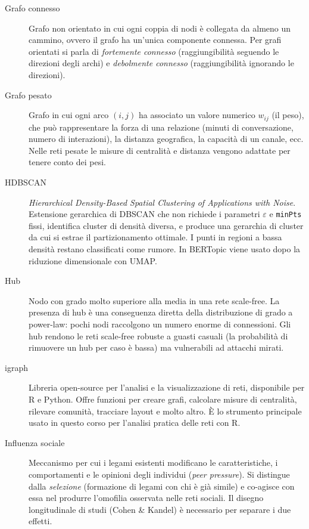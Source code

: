 \documentclass[12pt,a4paper]{article}
\begin{document}
\begin{description}
  \item[Grafo connesso] Grafo non orientato in cui ogni coppia di nodi è collegata da
  almeno un cammino, ovvero il grafo ha un'unica componente connessa. Per grafi orientati
  si parla di \textit{fortemente connesso} (raggiungibilità seguendo le direzioni degli
  archi) e \textit{debolmente connesso} (raggiungibilità ignorando le direzioni).

  \item[Grafo pesato] Grafo in cui ogni arco $(i,j)$ ha associato un valore numerico
  $w_{ij}$ (il peso), che può rappresentare la forza di una relazione (minuti di
  conversazione, numero di interazioni), la distanza geografica, la capacità di un canale,
  ecc. Nelle reti pesate le misure di centralità e distanza vengono adattate per tenere
  conto dei pesi.

  \item[HDBSCAN] \textit{Hierarchical Density-Based Spatial Clustering of Applications
  with Noise}. Estensione gerarchica di DBSCAN che non richiede i parametri $\varepsilon$
  e \texttt{minPts} fissi, identifica cluster di densità diversa, e produce una gerarchia
  di cluster da cui si estrae il partizionamento ottimale. I punti in regioni a bassa
  densità restano classificati come rumore. In BERTopic viene usato dopo la riduzione
  dimensionale con UMAP.

  \item[Hub] Nodo con grado molto superiore alla media in una rete scale-free. La
  presenza di hub è una conseguenza diretta della distribuzione di grado a power-law:
  pochi nodi raccolgono un numero enorme di connessioni. Gli hub rendono le reti
  scale-free robuste a guasti casuali (la probabilità di rimuovere un hub per caso è
  bassa) ma vulnerabili ad attacchi mirati.

  \item[igraph] Libreria open-source per l'analisi e la visualizzazione di reti,
  disponibile per R e Python. Offre funzioni per creare grafi, calcolare misure di
  centralità, rilevare comunità, tracciare layout e molto altro. È lo strumento
  principale usato in questo corso per l'analisi pratica delle reti con R.

  \item[Influenza sociale] Meccanismo per cui i legami esistenti modificano le
  caratteristiche, i comportamenti e le opinioni degli individui (\textit{peer pressure}).
  Si distingue dalla \textit{selezione} (formazione di legami con chi è già simile) e
  co-agisce con essa nel produrre l'omofilia osservata nelle reti sociali. Il disegno
  longitudinale di studi (Cohen \& Kandel) è necessario per separare i due effetti.


\end{description}
\end{document}
